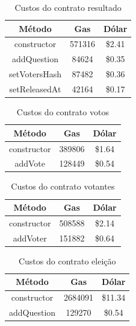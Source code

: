 \documentclass{ufsctex/ufsctex}
\begin{document}
\begin{table}[htb]
\centering
\begin{tabular}{||c|c|c||}
\hline
	\textbf{Método}        & \textbf{Gas}    & \textbf{Dólar}  \\  [0.2ex] \hline \hline
constructor   & 571316 & \$2.41 \\
addQuestion   & 84624  & \$0.35 \\ 
setVotersHash & 87482  & \$0.36 \\ 
setReleasedAt & 42164  & \$0.17 \\ \hline
\end{tabular}
\caption{Custos do contrato resultado}
\label{tab:my-table}
\end{table}

\begin{table}[htb]
\centering
\begin{tabular}{||c|c|c||}
		\hline
		\textbf{Método} & \textbf{Gas} & \textbf{Dólar}  \\ [0.2ex] \hline \hline
		constructor & 389806 & \$1.64 \\ 
		addVote     & 128449 & \$0.54 \\ \hline
	\end{tabular}
	\caption{Custos do contrato votos}
	\label{tab:my-table}
\end{table}

\begin{table}[htb]
	\centering
	\begin{tabular}{||c|c|c||}
		\hline
		\textbf{Método}  & \textbf{Gas} & \textbf{Dólar}  \\ [0.2ex] \hline \hline
		constructor & 508588 & \$2.14 \\ 
		addVoter    & 151882 & \$0.64 \\ \hline
	\end{tabular}
	\caption{Custos do contrato votantes}
	\label{tab:my-table}
\end{table}

\begin{table}[htb]
	\centering
	\begin{tabular}{||c|c|c||}
		\hline
		\textbf{Método} & \textbf{Gas}  & \textbf{Dólar}   \\ [0.2ex] \hline \hline
		constructor & 2684091 & \$11.34 \\ 
		addQuestion & 129270  & \$0.54  \\ \hline
	\end{tabular}
	\caption{Custos do contrato eleição}
	\label{tab:my-table}
\end{table}
\end{document}

